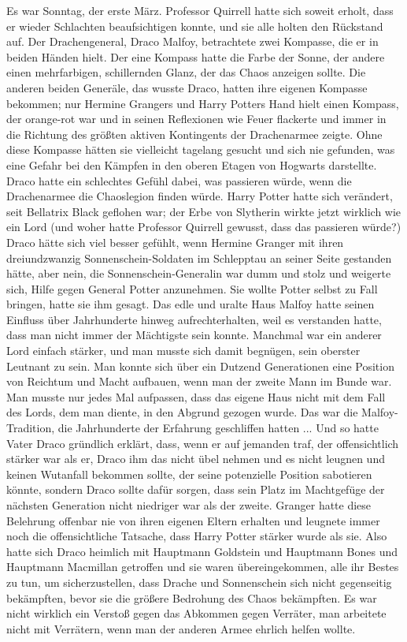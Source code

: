 Es war Sonntag, der erste März. Professor Quirrell hatte sich soweit erholt,
dass er wieder Schlachten beaufsichtigen konnte, und sie alle holten den
Rückstand auf. Der Drachengeneral, Draco Malfoy, betrachtete zwei Kompasse, die
er in beiden Händen hielt. Der eine Kompass hatte die Farbe der Sonne, der
andere einen mehrfarbigen, schillernden Glanz, der das Chaos anzeigen sollte.
Die anderen beiden Generäle, das wusste Draco, hatten ihre eigenen Kompasse
bekommen; nur Hermine Grangers und Harry Potters Hand hielt einen Kompass, der
orange-rot war und in seinen Reflexionen wie Feuer flackerte und immer in die
Richtung des größten aktiven Kontingents der Drachenarmee zeigte. Ohne diese
Kompasse hätten sie vielleicht tagelang gesucht und sich nie gefunden, was eine
Gefahr bei den Kämpfen in den oberen Etagen von Hogwarts darstellte. Draco hatte
ein schlechtes Gefühl dabei, was passieren würde, wenn die Drachenarmee die
Chaoslegion finden würde. Harry Potter hatte sich verändert, seit Bellatrix
Black geflohen war; der Erbe von Slytherin wirkte jetzt wirklich wie ein Lord
(und woher hatte Professor Quirrell gewusst, dass das passieren würde?) Draco
hätte sich viel besser gefühlt, wenn Hermine Granger mit ihren dreiundzwanzig
Sonnenschein-Soldaten im Schlepptau an seiner Seite gestanden hätte, aber nein,
die Sonnenschein-Generalin war dumm und stolz und weigerte sich, Hilfe gegen
General Potter anzunehmen. Sie wollte Potter selbst zu Fall bringen, hatte sie
ihm gesagt. Das edle und uralte Haus Malfoy hatte seinen Einfluss über
Jahrhunderte hinweg aufrechterhalten, weil es verstanden hatte, dass man nicht
immer der Mächtigste sein konnte. Manchmal war ein anderer Lord einfach stärker,
und man musste sich damit begnügen, sein oberster Leutnant zu sein. Man konnte
sich über ein Dutzend Generationen eine Position von Reichtum und Macht
aufbauen, wenn man der zweite Mann im Bunde war. Man musste nur jedes Mal
aufpassen, dass das eigene Haus nicht mit dem Fall des Lords, dem man diente, in
den Abgrund gezogen wurde. Das war die Malfoy-Tradition, die Jahrhunderte der
Erfahrung geschliffen hatten ... Und so hatte Vater Draco gründlich erklärt,
dass, wenn er auf jemanden traf, der offensichtlich stärker war als er, Draco
ihm das nicht übel nehmen und es nicht leugnen und keinen Wutanfall bekommen
sollte, der seine potenzielle Position sabotieren könnte, sondern Draco sollte
dafür sorgen, dass sein Platz im Machtgefüge der nächsten Generation nicht
niedriger war als der zweite. Granger hatte diese Belehrung offenbar nie von
ihren eigenen Eltern erhalten und leugnete immer noch die offensichtliche
Tatsache, dass Harry Potter stärker wurde als sie. Also hatte sich Draco
heimlich mit Hauptmann Goldstein und Hauptmann Bones und Hauptmann Macmillan
getroffen und sie waren übereingekommen, alle ihr Bestes zu tun, um
sicherzustellen, dass Drache und Sonnenschein sich nicht gegenseitig bekämpften,
bevor sie die größere Bedrohung des Chaos bekämpften. Es war nicht wirklich ein
Verstoß gegen das Abkommen gegen Verräter, man arbeitete nicht mit Verrätern,
wenn man der anderen Armee ehrlich helfen wollte.

